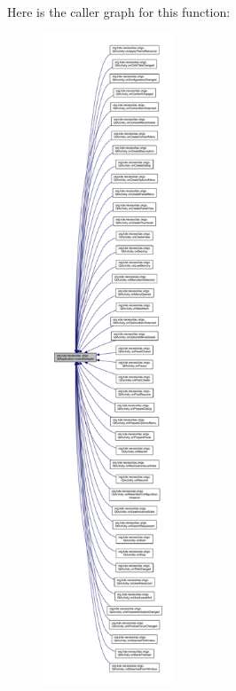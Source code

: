 Here is the caller graph for this function\-:
\nopagebreak
\begin{figure}[H]
\begin{center}
\leavevmode
\includegraphics[height=550pt]{d0/da0/classorg_1_1kde_1_1necessitas_1_1origo_1_1_qt_application_a9007552e161bf57f2a75125825d4444b_icgraph}
\end{center}
\end{figure}


